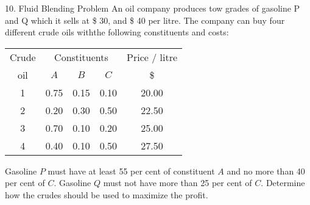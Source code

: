 \begin{frameExample}{10. Fluid Blending Problem}{}
  An oil company produces tow grades of gasoline P and Q which it sells at \$ 30, and \$ 40 per litre. The company can buy four different crude oils withthe following constituents and costs:

  {\centering
    \begin{tabular}{ccccc}
      \toprule
      Crude&\multicolumn{3}{c}{Constituents}& Price / litre\\
      \cmidrule{2-4}
      oil&$A$&$B$&$C$& \$ \\
      \midrule
      1&0.75&0.15&0.10 & 20.00\\
      2&0.20&0.30&0.50&22.50\\
      3&0.70&0.10&0.20&25.00\\
      4&0.40&0.10&0.50&27.50\\
      \bottomrule
    \end{tabular}
    \par}

  Gasoline $P$ must have at least 55 per cent of constituent $A$ and no more than 40 per cent of $C$. Gasoline $Q$ must not have more than 25 per cent of $C$. Determine how the crudes should be used to maximize the profit.
\end{frameExample}


